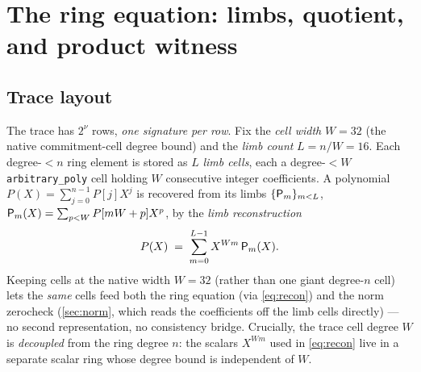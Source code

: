 \section{The ring equation: limbs, quotient, and product witness}\label{sec:arith}

\subsection{Trace layout}\label{sec:layout}

The trace has $2^{\nu}$ rows, \emph{one signature per row}. Fix the
\emph{cell width} $W = 32$ (the native commitment-cell degree bound) and
the \emph{limb count} $L = n/W = 16$. Each degree-$<n$ ring element is
stored as $L$ \emph{limb cells}, each a degree-$<W$ \texttt{arbitrary\_poly}
cell holding $W$ consecutive integer coefficients. A polynomial
$P(X) = \sum_{j=0}^{n-1} P[j] X^j$ is recovered from its limbs
$\{\mathsf{P}_m\}_{m<L}$, $\mathsf{P}_m(X) = \sum_{p<W} P[mW+p]X^p$, by the
\emph{limb reconstruction}
\begin{equation}\label{eq:recon}
  P(X) \;=\; \sum_{m=0}^{L-1} X^{W m}\, \mathsf{P}_m(X).
\end{equation}
Keeping cells at the native width $W=32$ (rather than one giant
degree-$n$ cell) lets the \emph{same} cells feed both the ring equation
(via \cref{eq:recon}) and the norm zerocheck (\cref{sec:norm}, which reads
the coefficients off the limb cells directly) --- no second
representation, no consistency bridge. Crucially, the trace cell degree
$W$ is \emph{decoupled} from the ring degree $n$: the scalars $X^{Wm}$
used in \cref{eq:recon} live in a separate scalar ring whose degree bound
is independent of $W$.

